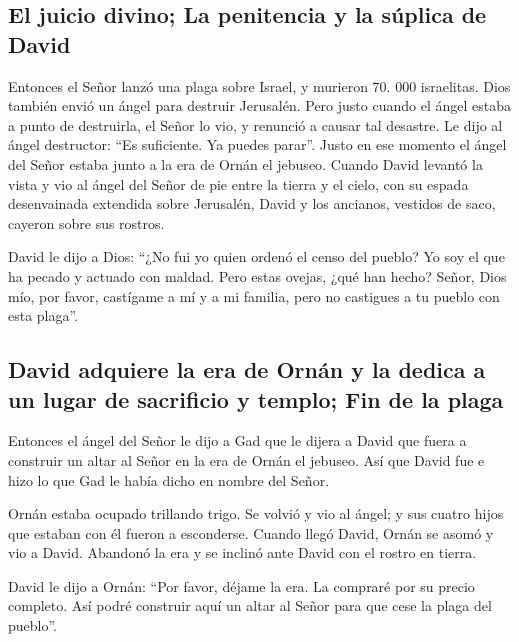 \hypertarget{el-juicio-divino-la-penitencia-y-la-suxfaplica-de-david}{%
\subsection{El juicio divino; La penitencia y la súplica de
David}\label{el-juicio-divino-la-penitencia-y-la-suxfaplica-de-david}}

 Entonces el Señor lanzó una plaga sobre Israel, y
murieron 70. 000 israelitas.  Dios también envió un ángel
para destruir Jerusalén. Pero justo cuando el ángel estaba a punto de
destruirla, el Señor lo vio, y renunció a causar tal desastre. Le dijo
al ángel destructor: ``Es suficiente. Ya puedes parar''. Justo en ese
momento el ángel del Señor estaba junto a la era de Ornán el jebuseo.
 Cuando David levantó la vista y vio al ángel del Señor
de pie entre la tierra y el cielo, con su espada desenvainada extendida
sobre Jerusalén, David y los ancianos, vestidos de saco, cayeron sobre
sus rostros.

 David le dijo a Dios: ``¿No fui yo quien ordenó el censo
del pueblo? Yo soy el que ha pecado y actuado con maldad. Pero estas
ovejas, ¿qué han hecho? Señor, Dios mío, por favor, castígame a mí y a
mi familia, pero no castigues a tu pueblo con esta plaga''.

\hypertarget{david-adquiere-la-era-de-ornuxe1n-y-la-dedica-a-un-lugar-de-sacrificio-y-templo-fin-de-la-plaga}{%
\subsection{David adquiere la era de Ornán y la dedica a un lugar de
sacrificio y templo; Fin de la
plaga}\label{david-adquiere-la-era-de-ornuxe1n-y-la-dedica-a-un-lugar-de-sacrificio-y-templo-fin-de-la-plaga}}

 Entonces el ángel del Señor le dijo a Gad que le dijera
a David que fuera a construir un altar al Señor en la era de Ornán el
jebuseo.  Así que David fue e hizo lo que Gad le había
dicho en nombre del Señor.

 Ornán estaba ocupado trillando trigo. Se volvió y vio al
ángel; y sus cuatro hijos que estaban con él fueron a esconderse.
 Cuando llegó David, Ornán se asomó y vio a David.
Abandonó la era y se inclinó ante David con el rostro en tierra.

 David le dijo a Ornán: ``Por favor, déjame la era. La
compraré por su precio completo. Así podré construir aquí un altar al
Señor para que cese la plaga del pueblo''.

